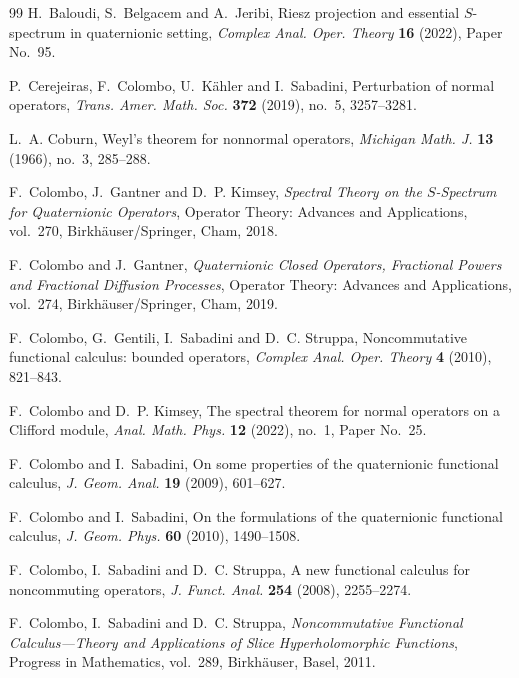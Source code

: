 \documentclass[12pt,a4paper]{article}
\theoremstyle{plain}
\theoremstyle{definition}
\theoremstyle{remark}
\begin{document}
{\begin{thebibliography}{99}
H.~Baloudi, S.~Belgacem and A.~Jeribi,
\newblock Riesz projection and essential $S$-spectrum in quaternionic
setting,
\newblock \emph{Complex Anal. Oper. Theory} \textbf{16} (2022),
Paper No.~95.

P.~Cerejeiras, F.~Colombo, U.~K\"ahler and I.~Sabadini,
\newblock Perturbation of normal operators,
\newblock \emph{Trans. Amer. Math. Soc.} \textbf{372} (2019), no.~5,
3257--3281.

L.~A. Coburn,
\newblock Weyl's theorem for nonnormal operators,
\newblock \emph{Michigan Math. J.} \textbf{13} (1966), no.~3, 285--288.

F.~Colombo, J.~Gantner and D.~P. Kimsey,
\newblock \emph{Spectral Theory on the $S$-Spectrum for Quaternionic
Operators},
\newblock Operator Theory: Advances and Applications, vol.~270,
Birkh\"auser/Springer, Cham, 2018.

F.~Colombo and J.~Gantner,
\newblock \emph{Quaternionic Closed Operators, Fractional Powers and
Fractional Diffusion Processes},
\newblock Operator Theory: Advances and Applications, vol.~274,
Birkh\"auser/Springer, Cham, 2019.

F.~Colombo, G.~Gentili, I.~Sabadini and D.~C. Struppa,
\newblock Noncommutative functional calculus: bounded operators,
\newblock \emph{Complex Anal. Oper. Theory} \textbf{4} (2010),
821--843.

F.~Colombo and D.~P. Kimsey,
\newblock The spectral theorem for normal operators on a Clifford
module,
\newblock \emph{Anal. Math. Phys.} \textbf{12} (2022), no.~1,
Paper No.~25.

F.~Colombo and I.~Sabadini,
\newblock On some properties of the quaternionic functional calculus,
\newblock \emph{J. Geom. Anal.} \textbf{19} (2009), 601--627.

F.~Colombo and I.~Sabadini,
\newblock On the formulations of the quaternionic functional calculus,
\newblock \emph{J. Geom. Phys.} \textbf{60} (2010), 1490--1508.

F.~Colombo, I.~Sabadini and D.~C. Struppa,
\newblock A new functional calculus for noncommuting operators,
\newblock \emph{J. Funct. Anal.} \textbf{254} (2008), 2255--2274.

F.~Colombo, I.~Sabadini and D.~C. Struppa,
\newblock \emph{Noncommutative Functional Calculus---Theory and
Applications of Slice Hyperholomorphic Functions},
\newblock Progress in Mathematics, vol.~289, Birkh\"auser, Basel,
2011.


\end{thebibliography}}
\end{document}
